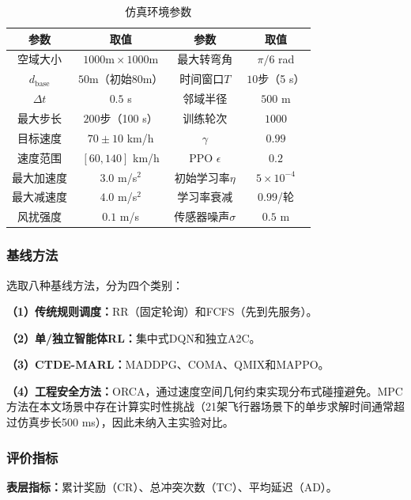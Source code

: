 \documentclass[12pt,a4paper,UTF8]{ctexart}
\begin{document}
\begin{table}[H]
    \centering\small
    \caption{仿真环境参数}
    \label{tab:env}
    \begin{tabular}{|c|c|c|c|}
        \hline
        \textbf{参数} & \textbf{取值} & \textbf{参数} & \textbf{取值} \\
        \hline
        空域大小 & $1000\text{m}\times1000\text{m}$ & 最大转弯角 & $\pi/6$ rad \\
        $d_{\text{base}}$ & $50\text{m}$（初始80m） & 时间窗口$T$ & $10$步（5 s） \\
        $\Delta t$ & $0.5$ s & 邻域半径 & $500$ m \\
        最大步长 & $200$步（100 s） & 训练轮次 & $1000$ \\
        目标速度 & $70\pm10$ km/h & $\gamma$ & $0.99$ \\
        速度范围 & $[60, 140]$ km/h & PPO $\epsilon$ & $0.2$ \\
        最大加速度 & $3.0$ m/s$^2$ & 初始学习率$\eta$ & $5\times10^{-4}$ \\
        最大减速度 & $4.0$ m/s$^2$ & 学习率衰减 & $0.99$/轮 \\
        风扰强度 & $0.1$ m/s & 传感器噪声$\sigma$ & $0.5$ m \\
        \hline
    \end{tabular}
\end{table}

\subsubsection{基线方法}

选取八种基线方法，分为四个类别：

\textbf{（1）传统规则调度：}RR（固定轮询）和FCFS（先到先服务）。

\textbf{（2）单/独立智能体RL：}集中式DQN和独立A2C。

\textbf{（3）CTDE-MARL：}MADDPG、COMA、QMIX和MAPPO。

\textbf{（4）工程安全方法：}ORCA\cite{ref4}，通过速度空间几何约束实现分布式碰撞避免。MPC方法在本文场景中存在计算实时性挑战（21架飞行器场景下的单步求解时间通常超过仿真步长500 ms），因此未纳入主实验对比。

\subsubsection{评价指标}

\textbf{表层指标：}累计奖励（CR）、总冲突次数（TC）、平均延迟（AD）。
\end{document}

